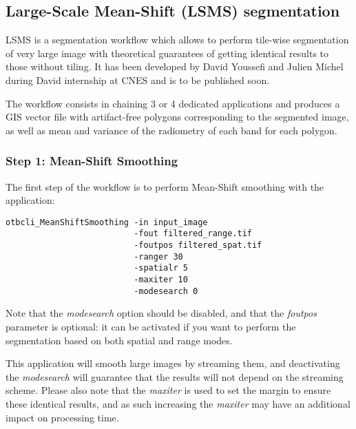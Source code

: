 
\subsection{Large-Scale Mean-Shift (LSMS) segmentation}

LSMS is a segmentation workflow which allows to perform tile-wise
segmentation of very large image with theoretical guarantees of
getting identical results to those without tiling. It has been
developed by David Youssefi and Julien Michel during David internship
at CNES and is to be published soon.

The workflow consists in chaining 3 or 4 dedicated applications and
produces a GIS vector file with artifact-free polygons corresponding
to the segmented image, as well as mean and variance of the radiometry
of each band for each polygon.

\subsubsection{Step 1: Mean-Shift Smoothing}

The first step of the workflow is to perform Mean-Shift smoothing with
the  application:

\begin{verbatim}
otbcli_MeanShiftSmoothing -in input_image 
                          -fout filtered_range.tif 
                          -foutpos filtered_spat.tif 
                          -ranger 30 
                          -spatialr 5 
                          -maxiter 10 
                          -modesearch 0
\end{verbatim}

Note that the \emph{modesearch} option should be disabled, and
that the \emph{foutpos} parameter is optional: it can be activated
if you want to perform the segmentation based on both spatial and
range modes.

This application will smooth large images by streaming them, and
deactivating the \emph{modesearch} will guarantee that the results
will not depend on the streaming scheme. Please also note that the
\emph{maxiter} is used to set the margin to ensure these
identical results, and as such increasing the \emph{maxiter} may
have an additional impact on processing time.

